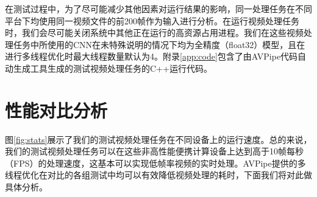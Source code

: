 在测试过程中，为了尽可能减少其他因素对运行结果的影响，同一处理任务在不同平台下均使用同一视频文件的前200帧作为输入进行分析。在运行视频处理任务时，我们会尽可能关闭系统中其他正在运行的高资源占用进程。我们在这些视频处理任务中所使用的CNN在未特殊说明的情况下均为全精度（float32）模型，且在进行多线程优化时最大线程数量默认为4。附录\ref{app:code}包含了由AVPipe代码自动生成工具生成的测试视频处理任务的C++运行代码。

\section{性能对比分析}

图\ref{fig:stats}展示了我们的测试视频处理任务在不同设备上的运行速度。总的来说，我们的测试视频处理任务可以在这些非高性能便携计算设备上达到高于10帧每秒（FPS）的处理速度，这基本可以实现低帧率视频的实时处理。AVPipe提供的多线程优化在对比的各组测试中均可以有效降低视频处理的耗时，下面我们将对此做具体分析。\par

